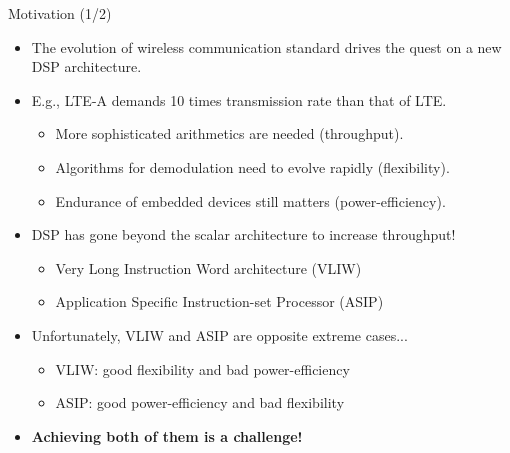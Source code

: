 \documentclass{beamer}
\begin{document}
\begin{CJK}{UTF8}{bkai}
    \begin{frame}{Motivation (1/2)}
        \begin{itemize}
            \item {
                    The evolution of wireless communication standard drives the quest on a new DSP architecture.
                }
            \item {
                    E.g., LTE-A demands 10 times transmission rate than that of LTE.
                    \begin{itemize}
                        \item {
                                More sophisticated arithmetics are needed (throughput).
                            }
                        \item {
                                Algorithms for demodulation need to evolve rapidly (flexibility).
                        }
                        \item {
                                Endurance of embedded devices still matters (power-efficiency).
                        }
                    \end{itemize}
                }
            \item{ 
                    DSP has gone beyond the scalar architecture to increase throughput!
                    \begin{itemize}
                        \item Very Long Instruction Word architecture (VLIW)
                        \item Application Specific Instruction-set Processor (ASIP)
                    \end{itemize}
                }
            \item {
                    Unfortunately, VLIW and ASIP are opposite extreme cases...
                    \begin{itemize}
                        \item VLIW: good flexibility and bad power-efficiency
                        \item ASIP: good power-efficiency and bad flexibility
                    \end{itemize}
                }
            \item \large{\textbf{Achieving both of them is a challenge!}}
        \end{itemize}
    \end{frame}


\end{CJK}
\end{document}
